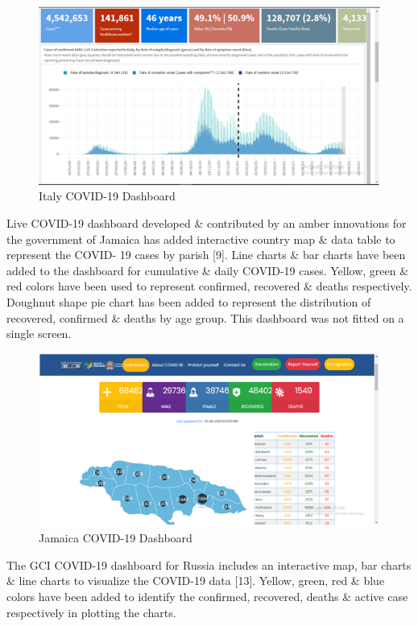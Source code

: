 \documentclass[
]{article}
\begin{document}
\begin{figure}
\includegraphics[width=8.12in]{Images/10} \caption{Italy COVID-19 Dashboard}\label{fig:unnamed-chunk-10}
\end{figure}

Live COVID-19 dashboard developed \& contributed by an amber innovations
for the government of Jamaica has added interactive country map \& data
table to represent the COVID- 19 cases by parish {[}9{]}. Line charts \&
bar charts have been added to the dashboard for cumulative \& daily
COVID-19 cases. Yellow, green \& red colors have been used to represent
confirmed, recovered \& deaths respectively. Doughnut shape pie chart
has been added to represent the distribution of recovered, confirmed \&
deaths by age group. This dashboard was not fitted on a single screen.

\begin{figure}
\includegraphics[width=8.35in]{Images/11} \caption{Jamaica COVID-19 Dashboard}\label{fig:unnamed-chunk-11}
\end{figure}

The GCI COVID-19 dashboard for Russia includes an interactive map, bar
charts \& line charts to visualize the COVID-19 data {[}13{]}. Yellow,
green, red \& blue colors have been added to identify the confirmed,
recovered, deaths \& active case respectively in plotting the charts.
\end{document}
